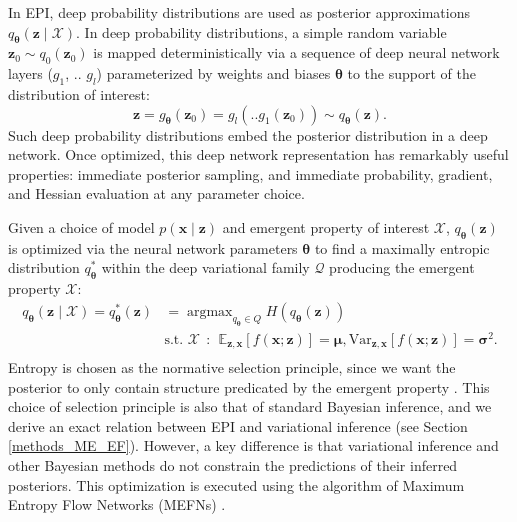 \documentclass[11pt]{article}
\DeclareMathOperator*{\argmax}{argmax}
\begin{document}
In EPI, deep probability distributions are used as posterior approximations $q_{\bm{\theta}}(\mathbf{z} \mid \mathcal{X})$.
 In deep probability distributions, a simple random variable $\mathbf{z}_0 \sim q_0(\mathbf{z}_0)$ is mapped deterministically via a sequence of deep neural network layers ($g_1$, .. $g_l$) parameterized by weights and biases $\bm{\theta}$ to the support of the distribution of interest:
\begin{equation} \label{eq:deep_transform}
\mathbf{z} = g_{\bm{\theta}}(\mathbf{z}_0) = g_l(..g_1(\mathbf{z}_0)) \sim q_{\bm{\theta}}(\mathbf{z}).
\end{equation}
Such deep probability distributions embed the posterior distribution in a deep network.
Once optimized, this deep network representation has remarkably useful properties: immediate posterior sampling, and immediate probability, gradient, and Hessian evaluation at any parameter choice.

Given a choice of model $p(\mathbf{x} \mid \mathbf{z})$ and emergent property of interest $\mathcal{X}$, $q_{\bm{\theta}}(\mathbf{z})$ is optimized via the neural network parameters $\bm{\theta}$ to find a maximally entropic distribution $q_{\bm{\theta}}^*$ within the deep variational family $\mathcal{Q}$ producing the emergent property $\mathcal{X}$:
\begin{equation} \label{eq:opt}
\begin{split}
q_{\bm{\theta}}(\mathbf{z} \mid \mathcal{X}) = q_{\bm{\theta}}^*(\mathbf{z}) &= \argmax_{q_{\bm{\theta}} \in Q} H(q_{\bm{\theta}}(\mathbf{z})) \\
 &  \text{s.t.  } \mathcal{X} ~~:~~ \mathbb{E}_{\mathbf{z},\mathbf{x}}\left[f(\mathbf{x}; \mathbf{z})\right] = \bm{\mu}, \text{Var}_{\mathbf{z},\mathbf{x}}\left[f(\mathbf{x}; \mathbf{z})\right] = \bm{\sigma}^2. \\
 \end{split}
\end{equation} 
Entropy is chosen as the normative selection principle, since we want the posterior to only contain structure predicated by the emergent property \cite{jaynes1957information, elsayed2017structure}.
This choice of selection principle is also that of standard Bayesian inference, and we derive an exact relation between EPI and variational inference (see Section \ref{methods_ME_EF}).
However, a key difference is that variational inference and other Bayesian methods do not constrain the predictions of their inferred posteriors.
This optimization is executed using the algorithm of Maximum Entropy Flow Networks (MEFNs) \cite{loaiza2017maximum}.
\end{document}
